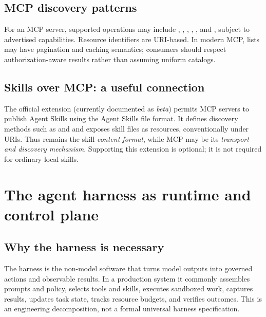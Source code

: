 \documentclass[11pt,letterpaper]{article}
\begin{document}
\subsection{MCP discovery patterns}
For an MCP server, supported operations may include , , , , , and , subject to advertised capabilities. Resource identifiers are URI-based. In modern MCP, lists may have pagination and caching semantics; consumers should respect authorization-aware results rather than assuming uniform catalogs.\cite{mcptools,mcpresources,mcp2026}

\subsection{Skills over MCP: a useful connection}
The official  extension (currently documented as \emph{beta}) permits MCP servers to publish Agent Skills using the Agent Skills file format. It defines discovery methods such as  and  and exposes skill files as resources, conventionally under  URIs. Thus  remains the skill \emph{content format}, while MCP may be its \emph{transport and discovery mechanism}. Supporting this extension is optional; it is not required for ordinary local skills.\cite{mcpskills}

\section{The agent harness as runtime and control plane}\label{sec:harness}
\subsection{Why the harness is necessary}
The harness is the non-model software that turns model outputs into governed actions and observable results. In a production system it commonly assembles prompts and policy, selects tools and skills, executes sandboxed work, captures results, updates task state, tracks resource budgets, and verifies outcomes. This is an engineering decomposition, not a formal universal harness specification.\cite{harnesslangchain,anthropicharness}
\end{document}
